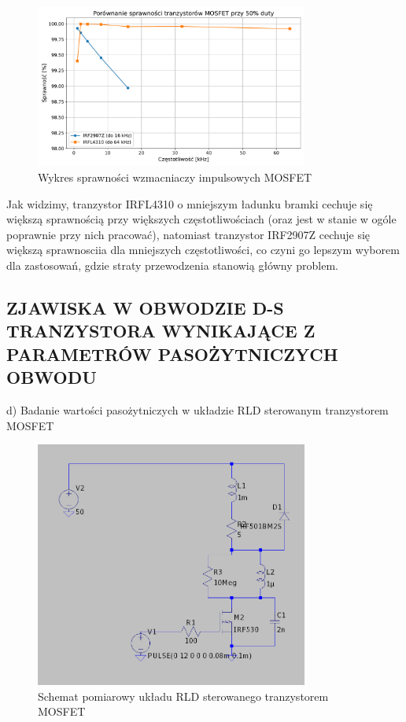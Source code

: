 \documentclass[11pt]{article}
\begin{document}
\begin{figure}[H]
\centering
\includegraphics[width=0.8\textwidth]{aun1_imp_mosfet_comparison.pdf}
\caption{Wykres sprawności wzmacniaczy impulsowych MOSFET}
\end{figure}

Jak widzimy, tranzystor IRFL4310 o mniejszym ładunku bramki cechuje się większą sprawnością przy większych częstotliwościach (oraz jest w stanie w ogóle poprawnie przy nich pracować), natomiast tranzystor IRF2907Z
cechuje się większą sprawnosciia dla mniejszych częstotliwości, co czyni go lepszym wyborem dla zastosowań, gdzie
straty przewodzenia stanowią główny problem.\\

\subsection{ZJAWISKA W OBWODZIE D-S TRANZYSTORA WYNIKAJĄCE Z PARAMETRÓW PASOŻYTNICZYCH OBWODU}

d) Badanie wartości pasożytniczych w układzie RLD sterowanym tranzystorem MOSFET

\begin{figure}[H]
\centering
\includegraphics[width=0.8\textwidth]{aun1_rld_without_snubber.png}
\caption{Schemat pomiarowy układu RLD sterowanego tranzystorem MOSFET}
\end{figure}
\end{document}
